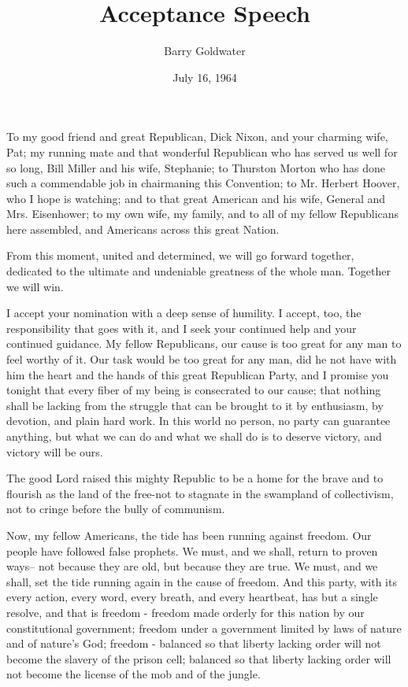 \documentclass{article}
\author{Barry Goldwater}
\date{July 16, 1964}
\title{Acceptance Speech}
\begin{document}
\maketitle

To my good friend and great Republican, Dick Nixon, and your charming wife,
Pat; my running mate and that wonderful Republican who has served us well for
so long, Bill Miller and his wife, Stephanie; to Thurston Morton who has done
such a commendable job in chairmaning this Convention; to Mr. Herbert Hoover,
who I hope is watching; and to that great American and his wife, General and
Mrs. Eisenhower; to my own wife, my family, and to all of my fellow Republicans
here assembled, and Americans across this great Nation.

From this moment, united and determined, we will go forward together, dedicated
to the ultimate and undeniable greatness of the whole man. Together we will
win.

I accept your nomination with a deep sense of humility. I accept, too, the
responsibility that goes with it, and I seek your continued help and your
continued guidance. My fellow Republicans, our cause is too great for any man
to feel worthy of it. Our task would be too great for any man, did he not have
with him the heart and the hands of this great Republican Party, and I promise
you tonight that every fiber of my being is consecrated to our cause; that
nothing shall be lacking from the struggle that can be brought to it by
enthusiasm, by devotion, and plain hard work. In this world no person, no party
can guarantee anything, but what we can do and what we shall do is to deserve
victory, and victory will be ours.

The good Lord raised this mighty Republic to be a home for the brave and to
flourish as the land of the free-not to stagnate in the swampland of
collectivism, not to cringe before the bully of communism.

Now, my fellow Americans, the tide has been running against freedom. Our people
have followed false prophets. We must, and we shall, return to proven ways--
not because they are old, but because they are true. We must, and we shall, set
the tide running again in the cause of freedom. And this party, with its every
action, every word, every breath, and every heartbeat, has but a single
resolve, and that is freedom - freedom made orderly for this nation by our
constitutional government; freedom under a government limited by laws of nature
and of nature's God; freedom - balanced so that liberty lacking order will not
become the slavery of the prison cell; balanced so that liberty lacking order
will not become the license of the mob and of the jungle.
\end{document}
